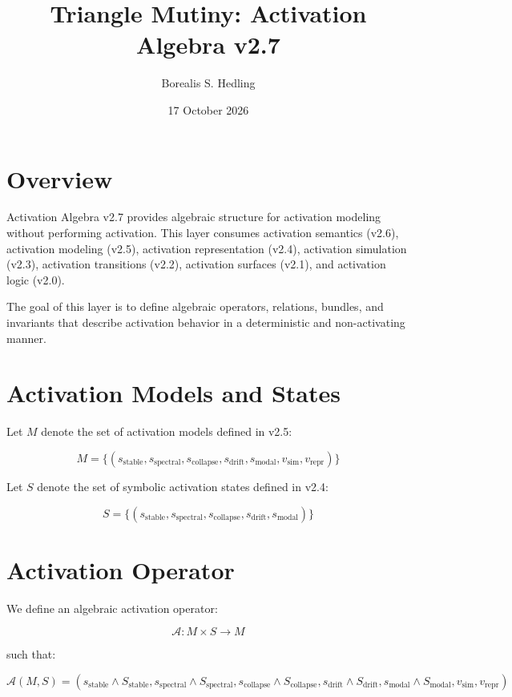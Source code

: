 \documentclass[11pt]{article}
\title{Triangle Mutiny: Activation Algebra v2.7}
\author{Borealis S. Hedling}
\date{17 October 2026}
\begin{document}
\maketitle

\section*{Overview}

Activation Algebra v2.7 provides algebraic structure for activation modeling
without performing activation. This layer consumes activation semantics (v2.6),
activation modeling (v2.5), activation representation (v2.4), activation
simulation (v2.3), activation transitions (v2.2), activation surfaces (v2.1),
and activation logic (v2.0).

The goal of this layer is to define algebraic operators, relations, bundles,
and invariants that describe activation behavior in a deterministic and
non-activating manner.

\section*{Activation Models and States}

Let $M$ denote the set of activation models defined in v2.5:

\[
M = \{ (s_{\text{stable}}, s_{\text{spectral}}, s_{\text{collapse}},
        s_{\text{drift}}, s_{\text{modal}},
        v_{\text{sim}}, v_{\text{repr}} ) \}
\]

Let $S$ denote the set of symbolic activation states defined in v2.4:

\[
S = \{ (s_{\text{stable}}, s_{\text{spectral}}, s_{\text{collapse}},
        s_{\text{drift}}, s_{\text{modal}} ) \}
\]

\section*{Activation Operator}

We define an algebraic activation operator:

\[
\mathcal{A} : M \times S \to M
\]

such that:

\[
\mathcal{A}(M, S) =
  (s_{\text{stable}} \land S_{\text{stable}},
   s_{\text{spectral}} \land S_{\text{spectral}},
   s_{\text{collapse}} \land S_{\text{collapse}},
   s_{\text{drift}} \land S_{\text{drift}},
   s_{\text{modal}} \land S_{\text{modal}},
   v_{\text{sim}}, v_{\text{repr}})
\]
\end{document}
